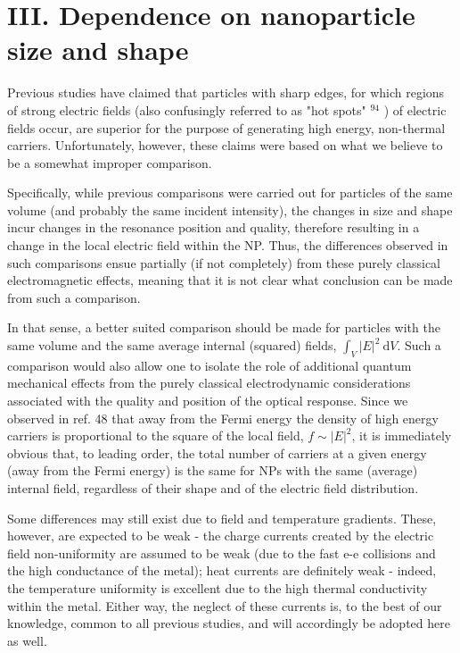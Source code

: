 \documentclass[10pt]{article}
\begin{document}
\section*{III. Dependence on nanoparticle size and shape}
Previous studies have claimed that particles with sharp edges, for which regions of strong electric fields (also confusingly referred to as "hot spots" ${ }^{94}$ ) of electric fields occur, are superior for the purpose of generating high energy, non-thermal carriers. Unfortunately, however, these claims were based on what we believe to be a somewhat improper comparison.

Specifically, while previous comparisons were carried out for particles of the same volume (and probably the same incident intensity), the changes in size and shape incur changes in the resonance position and quality, therefore resulting in a change in the local electric field within the NP. Thus, the differences observed in such comparisons ensue partially (if not completely) from these purely classical electromagnetic effects, meaning that it is not clear what conclusion can be made from such a comparison.

In that sense, a better suited comparison should be made for particles with the same volume and the same average internal (squared) fields, $\int_{V}|E|^{2} \mathrm{~d} V$. Such a comparison would also allow one to isolate the role of additional quantum mechanical effects from the purely classical electrodynamic considerations associated with the quality and position of the optical response. Since we observed in ref. 48 that away from the Fermi energy the density of high energy carriers is proportional to the square of the local field, $f \sim|E|^{2}$, it is immediately obvious that, to leading order, the total number of carriers at a given energy (away from the Fermi energy) is the same for NPs with the same (average) internal field, regardless of their shape and of the electric field distribution.

Some differences may still exist due to field and temperature gradients. These, however, are expected to be weak - the charge currents created by the electric field non-uniformity are assumed to be weak (due to the fast e-e collisions and the high conductance of the metal); heat currents are definitely weak - indeed, the temperature uniformity is excellent due to the high thermal conductivity within the metal. Either way, the neglect of these currents is, to the best of our knowledge, common to all previous studies, and will accordingly be adopted here as well.
\end{document}
